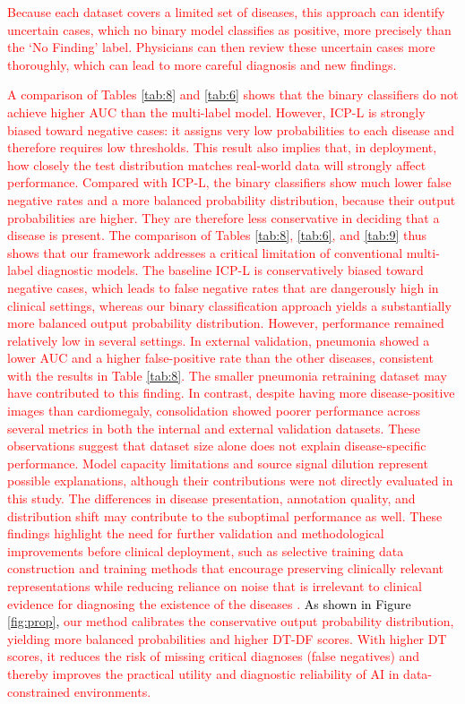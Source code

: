 \documentclass[preprint,7pt, a4paper]{elsarticle}
\begin{document}
\textcolor{black}{\textcolor{red}{Because each dataset covers a limited set of diseases, this approach can identify uncertain cases, which no binary model classifies as positive, more precisely than the `No Finding' label. Physicians can then review these uncertain cases more thoroughly, which can lead to more careful diagnosis and new findings.}}

\textcolor{black}{\textcolor{red}{A comparison of Tables \ref{tab:8} and \ref{tab:6} shows that the binary classifiers do not achieve higher AUC than the multi-label model. However, ICP-L is strongly biased toward negative cases: it assigns very low probabilities to each disease and therefore requires low thresholds. This result also implies that, in deployment, how closely the test distribution matches real-world data will strongly affect performance. Compared with ICP-L, the binary classifiers show much lower false negative rates and a more balanced probability distribution, because their output probabilities are higher. They are therefore less conservative in deciding that a disease is present. The comparison of Tables \ref{tab:8}, \ref{tab:6}, and \ref{tab:9} thus shows that our framework addresses a critical limitation of conventional multi-label diagnostic models. The baseline ICP-L is conservatively biased toward negative cases, which leads to false negative rates that are dangerously high in clinical settings, whereas our binary classification approach yields a substantially more balanced output probability distribution.} \textcolor{red}{However, performance remained relatively low in several settings. In external validation, pneumonia showed a lower AUC and a higher false-positive rate than the other diseases, consistent with the results in Table \ref{tab:8}. The smaller pneumonia retraining dataset may have contributed to this finding. In contrast, despite having more disease-positive images than cardiomegaly, consolidation showed poorer performance across several metrics in both the internal and external validation datasets. These observations suggest that dataset size alone does not explain disease-specific performance. Model capacity limitations \cite{85, 86} and source signal dilution \cite{87} represent possible explanations, although their contributions were not directly evaluated in this study. The differences in disease presentation, annotation quality, and distribution shift may contribute to the suboptimal performance as well. These findings highlight the need for further validation and methodological improvements before clinical deployment, such as selective training data construction \cite{89} and training methods that encourage preserving clinically relevant representations while reducing reliance on noise that is irrelevant to clinical evidence for diagnosing the existence of the diseases \cite{88}.} As shown in Figure \ref{fig:prop}, \textcolor{red}{our method calibrates the conservative output probability distribution, yielding more balanced probabilities and higher DT-DF scores. With higher DT scores, it reduces the risk of missing critical diagnoses (false negatives) and thereby improves the practical utility and diagnostic reliability of AI in data-constrained environments.}} 
\end{document}
